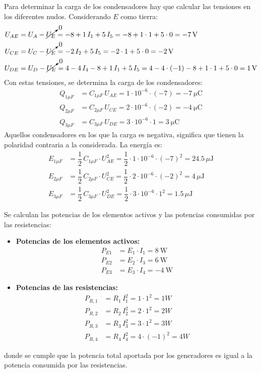 Para determinar la carga de los condensadores hay que calcular las
tensiones en los diferentes nudos. Considerando $E$ como tierra:
\begin{align*}
  U_{AE}&=U_{A}-\cancelto{0}{U_{E}}=-8+1\,I_1+5\,I_5=-8+1\cdot 1 + 5\cdot 0=\qty{-7}{\volt}\\
  U_{CE}&=U_{C}-\cancelto{0}{U_{E}}=-2\,I_2+5\,I_5=-2\cdot 1+5\cdot 0 =\qty{-2}{\volt}\\
  U_{DE}&=U_{D}-\cancelto{0}{U_{E}}=4-4\, I_4-8+1\,I_1+5\,I_5=4-4\cdot (-1)-8+1\cdot 1 +5\cdot 0=\qty{1}{\volt}
\end{align*}
Con estas tensiones, se determina la carga de los condensadores:
\begin{align*}
  Q_{1\mu F}&=C_{1\mu F}\, U_{AE} = 1\cdot 10^{-6}\cdot (-7)=\qty{-7}{\micro\coulomb}\\
  Q_{2\mu F}&=C_{2\mu F}\, U_{CE} = 2\cdot 10^{-6}\cdot (-2)=\qty{-4}{\micro\coulomb}\\
  Q_{3\mu F}&=C_{3\mu F}\, U_{DE} = 3\cdot 10^{-6}\cdot 1=\qty{3}{\micro\coulomb}
\end{align*}
Aquellos condensadores en los que la carga es negativa, significa que
tienen la polaridad contraria a la considerada. La energía es:
\begin{align*}
  E_{1\mu F}&=\dfrac{1}{2}\,C_{1\mu F}\cdot U_{AE}^2 = \dfrac{1}{2}\cdot 1\cdot 10^{-6}\cdot (-7)^2=24.5\,\mu\text{J}\\
  E_{2\mu F}&=\dfrac{1}{2}\,C_{2\mu F}\cdot U_{CE}^2 = \dfrac{1}{2}\cdot 2\cdot 10^{-6}\cdot (-2)^2=4\,\mu\text{J}\\
  E_{3\mu F}&=\dfrac{1}{2}\,C_{3\mu F}\cdot U_{DE}^2 = \dfrac{1}{2}\cdot 3\cdot 10^{-6}\cdot 1^2=1.5\,\mu\text{J}
\end{align*}

Se calculan las potencias de los elementos activos y las potencias consumidas por las resistencias:
\begin{itemize}
\item \textbf{Potencias de los elementos activos:}
    \begin{align*}
      P_{E1} &= E_1 \cdot I_1 = \qty{8}{\watt}\\
      P_{E2} &= E_2 \cdot I_3 = \qty{6}{\watt}\\
      P_{E3} &= E_3 \cdot I_4 = -\qty{4}{\watt}
    \end{align*}
\item \textbf{Potencias de las resistencias:}
    \begin{align*}
      P_{R,1}&=R_1\,I_1^2=1\cdot 1^2=1 W\\
      P_{R,2}&=R_2\,I_2^2=2\cdot 1^2=2 W\\
      P_{R,3}&=R_3\,I_3^2=3\cdot 1^2=3 W\\
      P_{R,4}&=R_4\,I_4^2=4\cdot (-1)^2=4 W
    \end{align*}
\end{itemize}
donde se cumple que la potencia total aportada por los generadores es igual a la potencia consumida por las resistencias.

